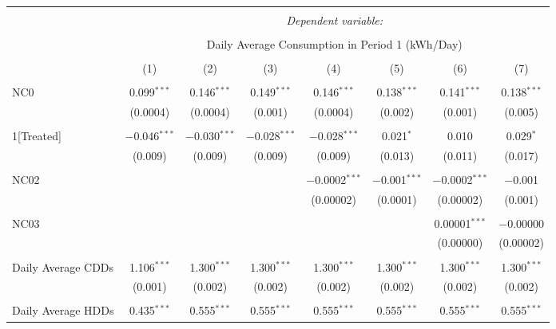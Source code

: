 
\begin{table}[!htbp] \centering 
  \caption{} 
  \label{} 
\small 
\begin{tabular}{@{\extracolsep{5pt}}lccccccc} 
\\[-1.8ex]\hline 
\hline \\[-1.8ex] 
 & \multicolumn{7}{c}{\textit{Dependent variable:}} \\ 
\cline{2-8} 
\\[-1.8ex] & \multicolumn{7}{c}{Daily Average Consumption in Period 1 (kWh/Day)} \\ 
\\[-1.8ex] & (1) & (2) & (3) & (4) & (5) & (6) & (7)\\ 
\hline \\[-1.8ex] 
 NC0 & 0.099$^{***}$ & 0.146$^{***}$ & 0.149$^{***}$ & 0.146$^{***}$ & 0.138$^{***}$ & 0.141$^{***}$ & 0.138$^{***}$ \\ 
  & (0.0004) & (0.0004) & (0.001) & (0.0004) & (0.002) & (0.001) & (0.005) \\ 
  & & & & & & & \\ 
 1[Treated] & $-$0.046$^{***}$ & $-$0.030$^{***}$ & $-$0.028$^{***}$ & $-$0.028$^{***}$ & 0.021$^{*}$ & 0.010 & 0.029$^{*}$ \\ 
  & (0.009) & (0.009) & (0.009) & (0.009) & (0.013) & (0.011) & (0.017) \\ 
  & & & & & & & \\ 
 NC02 &  &  &  & $-$0.0002$^{***}$ & $-$0.001$^{***}$ & $-$0.0002$^{***}$ & $-$0.001 \\ 
  &  &  &  & (0.00002) & (0.0001) & (0.00002) & (0.001) \\ 
  & & & & & & & \\ 
 NC03 &  &  &  &  &  & 0.00001$^{***}$ & $-$0.00000 \\ 
  &  &  &  &  &  & (0.00000) & (0.00002) \\ 
  & & & & & & & \\ 
 Daily Average CDDs & 1.106$^{***}$ & 1.300$^{***}$ & 1.300$^{***}$ & 1.300$^{***}$ & 1.300$^{***}$ & 1.300$^{***}$ & 1.300$^{***}$ \\ 
  & (0.001) & (0.002) & (0.002) & (0.002) & (0.002) & (0.002) & (0.002) \\ 
  & & & & & & & \\ 
 Daily Average HDDs & 0.435$^{***}$ & 0.555$^{***}$ & 0.555$^{***}$ & 0.555$^{***}$ & 0.555$^{***}$ & 0.555$^{***}$ & 0.555$^{***}$ \\ 

\end{tabular}
\end{table}
